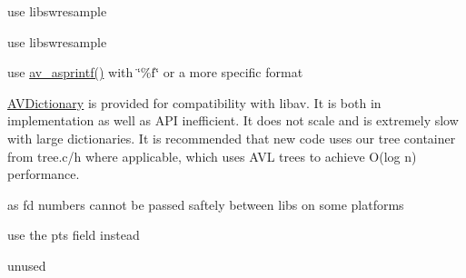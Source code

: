\begin{DoxyRefList}
%
use libswresample 
\item[Member \mbox{\hyperlink{group__lavr_ga6b89aa6fd4a6063f3be41d7530b2e2a1}{avresample\+\_\+config}} (\mbox{\hyperlink{struct_a_v_audio_resample_context}{A\+V\+Audio\+Resample\+Context}} $\ast$avr, \mbox{\hyperlink{struct_a_v_frame}{A\+V\+Frame}} $\ast$out, \mbox{\hyperlink{struct_a_v_frame}{A\+V\+Frame}} $\ast$in)]\label{deprecated__deprecated000082}%
%
use libswresample 
\item[Member \mbox{\hyperlink{group__lavu__string_ga7891d6df866d42e4a2fab2cc4eb46907}{av\+\_\+d2str}} (double d)]\label{deprecated__deprecated000083}%
%
use \mbox{\hyperlink{avstring_8c_a8cee948e00ad684c285e0f98639fcd21}{av\+\_\+asprintf()}} with \char`\"{}\%f\char`\"{} or a more specific format  
\item[File \mbox{\hyperlink{dict_8h}{dict.h}} ]\label{deprecated__deprecated000084}%
%
 \mbox{\hyperlink{struct_a_v_dictionary}{A\+V\+Dictionary}} is provided for compatibility with libav. It is both in implementation as well as A\+PI inefficient. It does not scale and is extremely slow with large dictionaries. It is recommended that new code uses our tree container from tree.\+c/h where applicable, which uses A\+VL trees to achieve O(log n) performance.  
\item[Member \mbox{\hyperlink{file_8h_a8c2cb7d30f32e871d353c2f2b2dd6ba2}{av\+\_\+tempfile}} (const char $\ast$prefix, char $\ast$$\ast$filename, int log\+\_\+offset, void $\ast$log\+\_\+ctx)]\label{deprecated__deprecated000085}%
%
as fd numbers cannot be passed saftely between libs on some platforms  
\item[Member \mbox{\hyperlink{struct_a_v_frame_a3622b748fe215af3821ebb1c9e514c6b}{A\+V\+Frame\+::pkt\+\_\+pts}} ]\label{deprecated__deprecated000086}%
%
use the pts field instead  
\item[Member \mbox{\hyperlink{struct_a_v_frame_a346b93aa671751477ec4361cf567e9c9}{A\+V\+Frame\+::error}} \mbox{[}A\+V\+\_\+\+N\+U\+M\+\_\+\+D\+A\+T\+A\+\_\+\+P\+O\+I\+N\+T\+E\+RS\mbox{]}]\label{deprecated__deprecated000087}%
%
unused  
\item[Member \mbox{\hyperlink{group__avoptions_gaaec97eabd1bd71521a262faa752dbb4a}{av\+\_\+opt\+\_\+child\+\_\+class\+\_\+next}} (const \mbox{\hyperlink{struct_a_v_class}{A\+V\+Class}} $\ast$parent, const \mbox{\hyperlink{struct_a_v_class}{A\+V\+Class}} $\ast$prev)]\label{deprecated__deprecated000088}%
$$
\end{DoxyRefList}
